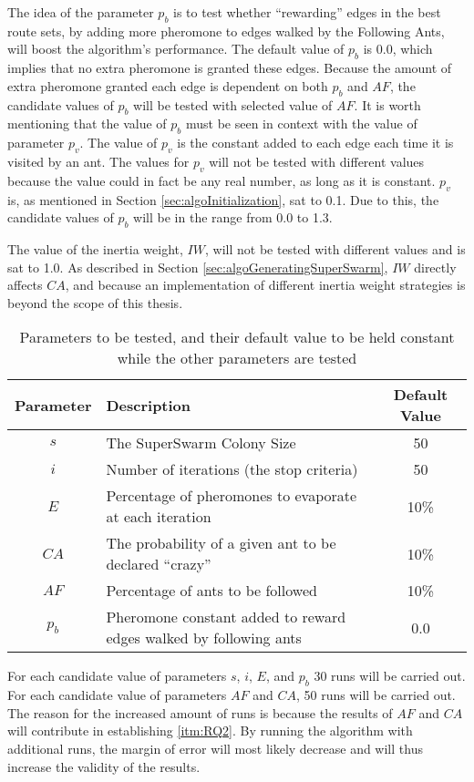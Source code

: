 The idea of the parameter $p_b$ is to test whether ``rewarding'' edges in the best route sets, by adding more pheromone to edges walked by the Following Ants, will boost the algorithm's performance. The default value of $p_b$ is 0.0, which implies that no extra pheromone is granted these edges. Because the amount of extra pheromone granted each edge is dependent on both $p_b$ and $AF$, the candidate values of $p_b$ will be tested with selected value of $AF$. It is worth mentioning that the value of $p_b$ must be seen in context with the value of parameter $p_v$. The value of $p_v$ is the constant added to each edge each time it is visited by an ant. The values for $p_v$ will not be tested with different values because the value could in fact be any real number, as long as it is constant. $p_v$ is, as mentioned in Section \vref{sec:algoInitialization}, sat to 0.1. Due to this, the candidate values of $p_b$ will be in the range from 0.0 to 1.3. 

The value of the inertia weight, $IW$, will not be tested with different values and is sat to 1.0. As described in Section \vref{sec:algoGeneratingSuperSwarm}, $IW$ directly affects $CA$, and because an implementation of different inertia weight strategies is beyond the scope of this thesis. 

\begin{table}[H]
    \centering
    \hspace*{-0.5cm}
	\begin{tabular}{|c|m{8.5cm}|c|}
    	\hline
    	Parameter & Description & Default Value\\
    	\hline
    	$s$ & The SuperSwarm Colony Size & 50\\
    	$i$ & Number of iterations (the stop criteria) & 50\\
    	$E$ & Percentage of pheromones to evaporate at each iteration & 10\%\\
    	$CA$ & The probability of a given ant to be declared ``crazy'' & 10\%\\
    	$AF$ & Percentage of ants to be followed & 10\%\\
        $p_b$ & Pheromone constant added to reward edges walked by following ants & 0.0\\
   	    \hline
    \end{tabular}
    \caption {Parameters to be tested, and their default value to be held constant while the other parameters are tested}
    \label{table:parameters}
\end{table}
%
For each candidate value of parameters $s$, $i$, $E$, and $p_b$ 30 runs will be carried out. For each candidate value of parameters $AF$ and $CA$, 50 runs will be carried out. The reason for the increased amount of runs is because the results of $AF$ and $CA$ will contribute in establishing \vref{itm:RQ2}. By running the algorithm with additional runs, the margin of error will most likely decrease and will thus increase the validity of the results.

